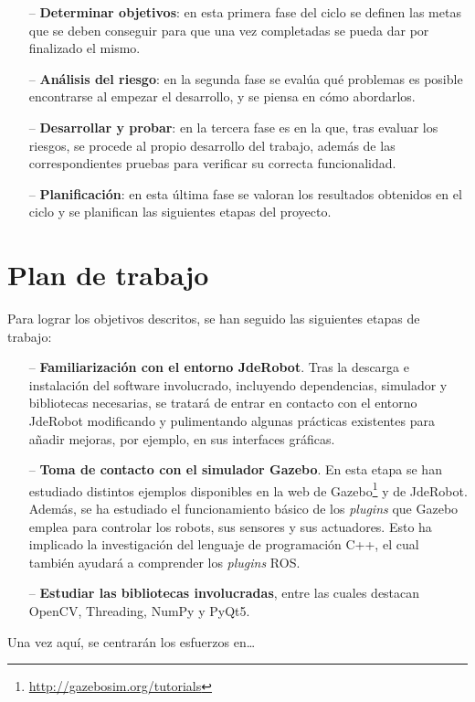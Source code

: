 \begin{itemize}
	\item[--] \textbf{Determinar objetivos}: en esta primera fase del ciclo se definen las metas que se deben conseguir para que una vez completadas se pueda dar por finalizado el mismo.
	\item[--] \textbf{Análisis del riesgo}: en la segunda fase se evalúa qué problemas es posible encontrarse al empezar el desarrollo, y se piensa en cómo abordarlos.
	\item[--] \textbf{Desarrollar y probar}: en la tercera fase es en la que, tras evaluar los riesgos, se procede al propio desarrollo del trabajo, además de las correspondientes pruebas para verificar su correcta funcionalidad.
	\item[--] \textbf{Planificación}: en esta última fase se valoran los resultados obtenidos en el ciclo y se planifican las siguientes etapas del proyecto.
\end{itemize}

\section{Plan de trabajo}
Para lograr los objetivos descritos, se han seguido las siguientes etapas de trabajo:

\begin{itemize}
	\item[--] \textbf{Familiarización con el entorno JdeRobot}. Tras la descarga e instalación del software  involucrado, incluyendo dependencias, simulador y bibliotecas necesarias, se tratará de entrar en contacto con el entorno JdeRobot modificando y pulimentando algunas prácticas existentes para añadir mejoras, por ejemplo, en sus interfaces gráficas.
	\item[--] \textbf{Toma de contacto con el simulador Gazebo}. En esta etapa se han estudiado distintos ejemplos disponibles en la web de Gazebo\footnote{\url{http://gazebosim.org/tutorials}} y de JdeRobot. Además, se ha estudiado el funcionamiento básico de los \textit{plugins}  que Gazebo emplea para controlar los robots, sus sensores y sus actuadores. Esto ha implicado la investigación del lenguaje de programación C++, el cual también ayudará a comprender los \textit{plugins} ROS.
	\item[--] \textbf{Estudiar las bibliotecas involucradas}, entre las cuales destacan OpenCV, Threading, NumPy y PyQt5.
\end{itemize}

Una vez aquí, se centrarán los esfuerzos en…

